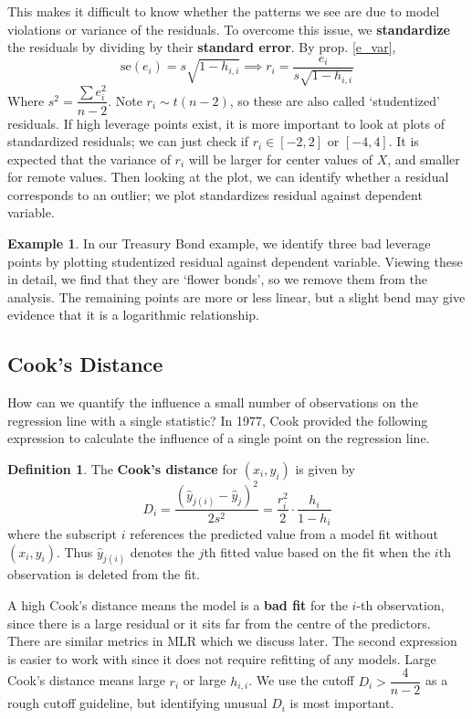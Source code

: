 \documentclass[12pt, a4paper]{article}
\theoremstyle{definition}
\newtheorem{definition}{Definition}
\newtheorem{example}{Example}
\newcommand{\imp}{\implies}
\newcommand{\f}{\frac}
\newcommand{\df}{\dfrac}
\begin{document}
	This makes it difficult to know whether the patterns we see are due to model violations or variance of the residuals. To overcome this issue, we {\bf standardize} the residuals by dividing by their {\bf standard error}. By prop. \ref{e_var}, 
	$$
		\text{se}(e_i) = s\sqrt{1 - h_{i,i}} \imp r_i = \f{e_i}{s\sqrt{1 - h_{i,i}}}
	$$
	Where  $s^2 = \df{\sum e_i^2}{n-2}$. Note $r_i \sim t(n-2)$, so these are also called `studentized' residuals. If high leverage points exist, it is more important to look at plots of standardized residuals; we can just check if $r_i \in [-2,2]$ or $[-4,4]$. It is expected that the variance of $r_i$ will be larger for center values of $X$, and smaller for remote values. Then looking at the plot, we can identify whether a residual corresponds to an outlier; we plot standardizes residual against dependent variable.
	
	\begin{example}
		In our Treasury Bond example, we identify three bad leverage points by plotting studentized residual against dependent variable. Viewing these in detail, we find that they are `flower bonds', so we remove them from the analysis. The remaining points are more or less linear, but a slight bend may give evidence that it is a logarithmic relationship.
	\end{example}

	\subsection{Cook's Distance}
	
	How can we quantify the influence a small number of observations on the regression line with a single statistic? In 1977, Cook provided the following expression to calculate the influence of a single point on the regression line.
	
	\begin{definition}
		The {\bf Cook's distance} for $(x_i, y_i)$ is given by
		$$
		D_i = \f{(\hat y_{j (i)} - \hat y_j)^2}{2s^2} = \f{r_i^2}{2} \cdot \f{h_i}{1-h_i}
		$$
		where the subscript $i$ references the predicted value from a model fit without $(x_i, y_i)$. Thus $\hat y_{j (i)}$ denotes the $j$th fitted value based on the fit when the $i$th observation is deleted from the fit.
	\end{definition}

	A high Cook's distance means the model is a  {\bf bad fit} for the $i$-th observation, since there is a large residual or it sits far from the centre of the predictors.	There are similar metrics in MLR which we discuss later. The second expression is easier to work with since it does not require refitting of any models. Large Cook's distance means large $r_i$ or large $h_{i,i}$. We use the cutoff $D_i > \df4{n-2}$ as a rough cutoff guideline, but identifying unusual $D_i$ is most important.
	
\end{document}
